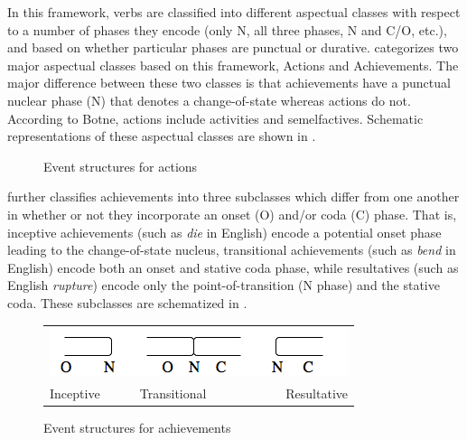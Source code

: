 \documentclass[output=paper,newtxmath,modfonts,nonflat,draftmode]{langsci/langscibook}
\begin{document}
In this framework, verbs are classified into different aspectual classes with respect to a number of phases they encode (only N, all three phases, N and C/O, etc.), and based on whether particular phases are punctual or durative. \citet[32--33]{Botne2010} categorizes two major aspectual classes based on this framework, Actions and Achievements. The major difference between these two classes is that achievements have a punctual nuclear phase (N) that denotes a change-of-state whereas actions do not. According to Botne, actions include  activities and semelfactives. Schematic representations of these aspectual classes are shown in .

\begin{figure}
\caption{Event structures for actions \citep[33]{Botne2010}}
\label{fig:kanijo:2}
\end{figure}

\citet{Botne2010} further classifies achievements into three subclasses which differ from one another in whether or not they incorporate an onset (O) and/or coda (C) phase. That is, inceptive achievements (such as \textit{die} in English) encode a potential onset phase leading to the change-of-state nucleus, transitional achievements (such as \textit{bend} in English) encode both an onset and stative coda phase, while resultatives (such as English \textit{rupture}) encode only the point-of-transition (N phase) and the stative coda. These subclasses are schematized in .

\begin{figure}
\caption{Event structures for achievements \citep[33]{Botne2010}
} 
\begin{tabularx}{.6\textwidth}{XXr}
\multicolumn{3}{c}{\includegraphics[width=.6\textwidth]{figures/kanijo-img3.png}}\\
Inceptive & Transitional & Resultative\\
\end{tabularx}
\label{fig:kanijo:3}
\end{figure}
\end{document}
